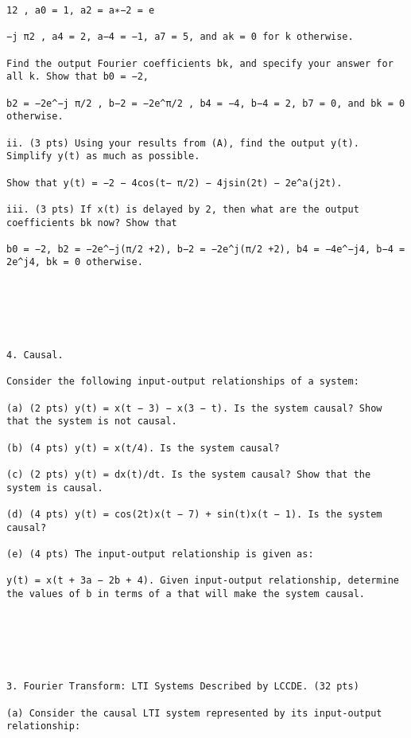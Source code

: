 \documentclass[11pt,addpoints]{exam}
\begin{document}
\begin{center}
\end{center}




\begin{verbatim}
12 , a0 = 1, a2 = a∗−2 = e

−j π2 , a4 = 2, a−4 = −1, a7 = 5, and ak = 0 for k otherwise.

Find the output Fourier coefficients bk, and specify your answer for all k. Show that b0 = −2,

b2 = −2e^−j π/2 , b−2 = −2e^π/2 , b4 = −4, b−4 = 2, b7 = 0, and bk = 0 otherwise.

ii. (3 pts) Using your results from (A), find the output y(t). Simplify y(t) as much as possible.

Show that y(t) = −2 − 4cos(t− π/2) − 4jsin(2t) − 2e^a(j2t).

iii. (3 pts) If x(t) is delayed by 2, then what are the output coefficients bk now? Show that

b0 = −2, b2 = −2e^−j(π/2 +2), b−2 = −2e^j(π/2 +2), b4 = −4e^−j4, b−4 = 2e^j4, bk = 0 otherwise.






4. Causal.

Consider the following input-output relationships of a system:

(a) (2 pts) y(t) = x(t − 3) − x(3 − t). Is the system causal? Show that the system is not causal.

(b) (4 pts) y(t) = x(t/4). Is the system causal?

(c) (2 pts) y(t) = dx(t)/dt. Is the system causal? Show that the system is causal.

(d) (4 pts) y(t) = cos(2t)x(t − 7) + sin(t)x(t − 1). Is the system causal?

(e) (4 pts) The input-output relationship is given as:

y(t) = x(t + 3a − 2b + 4). Given input-output relationship, determine the values of b in terms of a that will make the system causal.






3. Fourier Transform: LTI Systems Described by LCCDE. (32 pts)

(a) Consider the causal LTI system represented by its input-output relationship:


\end{verbatim}
\end{document}
